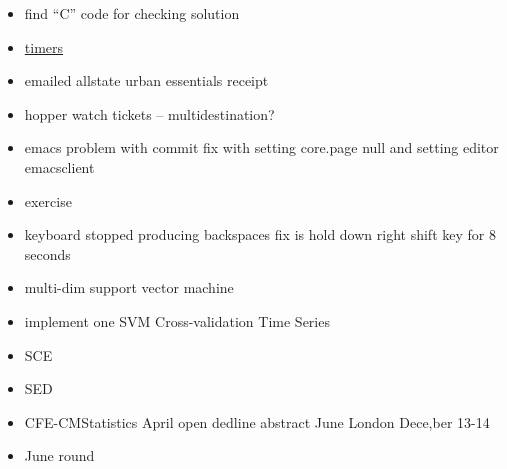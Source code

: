 \documentclass[hyperref]{labbook}
\begin{document}

\begin{itemize}
\item find ``C'' code for checking solution
\item \href{https://www.cs.rutgers.edu/~pxk/416/notes/c-tutorials/times.html}{timers}
\end{itemize}

\begin{itemize}
\item emailed allstate urban essentials  receipt 
\item hopper watch tickets -- multidestination?
\item emacs problem with commit  fix with setting core.page null and setting editor emacsclient
\item exercise
\item keyboard stopped producing backspaces  fix is hold down right shift key  for 8 seconds
\end{itemize}


\begin{itemize}
\item multi-dim support vector machine
\end{itemize}


\begin{itemize}
\item implement one SVM Cross-validation Time Series
\end{itemize}

\begin{itemize}
\item SCE
\item SED
\item CFE-CMStatistics  April open dedline abstract June  London Dece,ber 13-14
\end{itemize}

\begin{itemize}
\item June round
\end{itemize}

\end{document}
